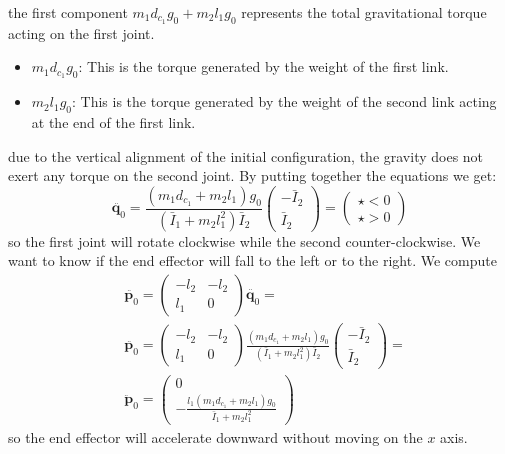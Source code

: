 \documentclass[10pt, a4paper]{report}
\begin{document}
the first component $ m_1d_{c_1}g_0+m_2l_1g_0$ represents the total gravitational torque acting on the first joint.\begin{itemize}
    \item $m_1 d_{c_1} g_0$: This is the torque generated by the weight of the first link.
    \item $m_2 l_1 g_0$: This is the torque generated by the weight of the second link acting at the end of the first link.
\end{itemize}
due to the vertical alignment of the initial configuration, the gravity does not exert any torque on the second joint. By putting together the equations we get:\begin{equation}
    \ddot{\mathbf q_0}=\frac{(m_1d_{c_1}+m_2l_1)g_0}{(\bar I_1+m_2l_1^2)\bar I_2}\begin{pmatrix}
        -\bar I_2\\ \bar I_2
    \end{pmatrix}=\begin{pmatrix}
        \star<0\\ \star > 0
    \end{pmatrix}
\end{equation}
so the first joint will rotate clockwise while the second counter-clockwise. We want to know if the end effector will fall to the left or to the right. We compute \begin{align}
    &\ddot{\mathbf p_0}=\begin{pmatrix}
        -l_2&-l_2\\ 
        l_1&0
    \end{pmatrix}\ddot{\mathbf q_0}=\\ 
    &\ddot{\mathbf p_0}=\begin{pmatrix}
        -l_2&-l_2\\ 
        l_1&0
    \end{pmatrix}\frac{(m_1d_{c_1}+m_2l_1)g_0}{(\bar I_1+m_2l_1^2)\bar I_2}\begin{pmatrix}
        -\bar I_2\\ \bar I_2
    \end{pmatrix}=\\ 
    &\ddot{\mathbf{p}}_0 = \begin{pmatrix} 0 \\ -\frac{l_1 (m_1 d_{c_1} + m_2 l_1)g_0}{\bar{I}_1 + m_2 l_1^2} \end{pmatrix}
\end{align}
so the end effector will accelerate downward without moving on the $x$ axis.
\end{document}
